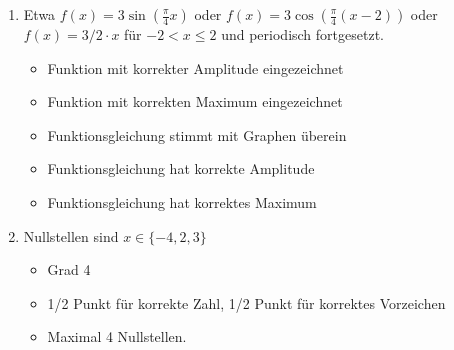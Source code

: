 \item
	\begin{enumerate}
	
		\item Etwa $f(x) = 3 \sin(\frac{\pi}{4}x)$ oder $f(x) = 3 \cos(\frac{\pi}{4}(x-2))$ oder $f(x) = 3/2\cdot x$ für $-2 < x \le 2$ und periodisch fortgesetzt.
			\begin{itemize}
				\item Funktion mit korrekter Amplitude eingezeichnet
				\item Funktion mit korrekten Maximum eingezeichnet
				\item Funktionsgleichung  stimmt mit Graphen überein
				\item Funktionsgleichung hat korrekte Amplitude
				\item Funktionsgleichung hat korrektes Maximum
			\end{itemize}
				
		\item Nullstellen sind $x \in \{ -4, 2, 3 \}$
			\begin{itemize}
				\item Grad 4
				\item 1/2 Punkt für korrekte Zahl, 1/2 Punkt für korrektes Vorzeichen
				\item Maximal 4 Nullstellen.
			\end{itemize}
	
	\end{enumerate}
